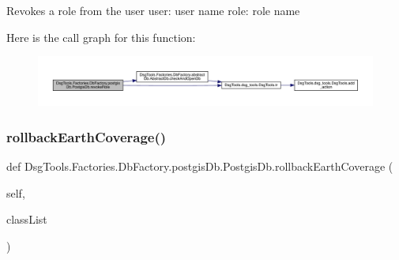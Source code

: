 \begin{DoxyVerb}Revokes a role from the user
user: user name
role: role name
\end{DoxyVerb}
 Here is the call graph for this function\+:
\nopagebreak
\begin{figure}[H]
\begin{center}
\leavevmode
\includegraphics[width=350pt]{class_dsg_tools_1_1_factories_1_1_db_factory_1_1postgis_db_1_1_postgis_db_a2ad59cb20111f3290e69a630da3d5676_cgraph}
\end{center}
\end{figure}
\mbox{\label{class_dsg_tools_1_1_factories_1_1_db_factory_1_1postgis_db_1_1_postgis_db_a6f43ff84be219d8dc9061838aeb436d2}} 
\subsubsection{\texorpdfstring{rollback\+Earth\+Coverage()}{rollbackEarthCoverage()}}
{\footnotesize\ttfamily def Dsg\+Tools.\+Factories.\+Db\+Factory.\+postgis\+Db.\+Postgis\+Db.\+rollback\+Earth\+Coverage (\begin{DoxyParamCaption}\item[{}]{self,  }\item[{}]{class\+List }\end{DoxyParamCaption})}

